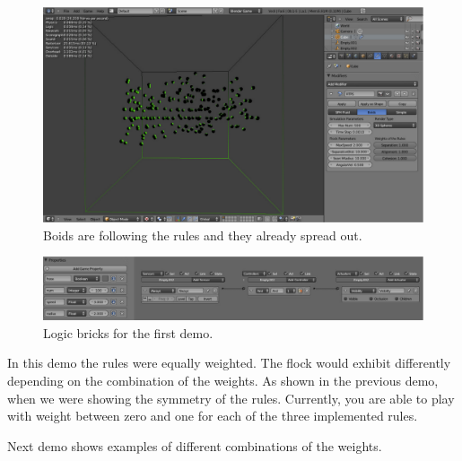 \begin{figure}[htbp]
\begin{center}
\includegraphics[scale=0.32]{figures/demo1_2.pdf}
\caption{Boids are following the rules and they already spread out.}
\label{demo1_2}
\end{center}
\end{figure}

\begin{figure}[htbp]
\begin{center}
\includegraphics[scale=0.32]{figures/demo1_logic.pdf}
\caption{Logic bricks for the first demo.}
\label{demo1_label}
\end{center}
\end{figure}


In this demo the rules were equally weighted. The flock would exhibit differently depending on the combination of the weights. As shown in the previous demo, when we were showing the symmetry of the rules. Currently, you are able to play with weight between zero and one for each of the three implemented rules.

Next demo shows examples of different combinations of the weights.


